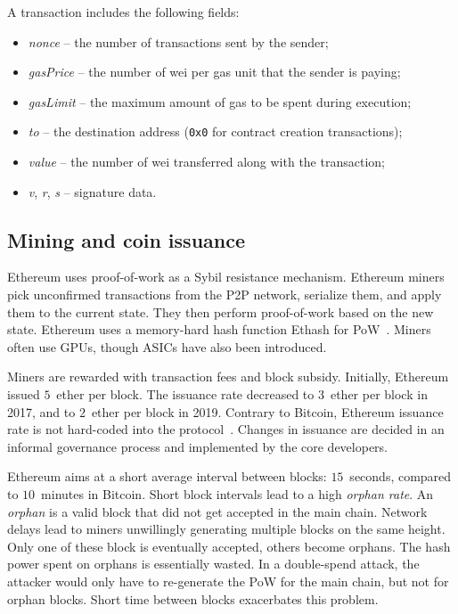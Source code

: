 A transaction includes the following fields:
\begin{itemize}
	\item \emph{nonce} -- the number of transactions sent by the sender;
	\item \emph{gasPrice} -- the number of wei per gas unit that the sender is paying;
	\item \emph{gasLimit} -- the maximum amount of gas to be spent during execution;
	\item \emph{to} -- the destination address (\texttt{0x0} for contract creation transactions);
	\item \emph{value} -- the number of wei transferred along with the transaction;
	\item \emph{v}, \emph{r}, \emph{s} -- signature data.
\end{itemize}



\subsection{Mining and coin issuance}

Ethereum uses proof-of-work as a Sybil resistance mechanism.
Ethereum miners pick unconfirmed transactions from the P2P network, serialize them, and apply them to the current state.
They then perform proof-of-work based on the new state.
Ethereum uses a memory-hard hash function Ethash for PoW~\cite{Ethash}.
Miners often use GPUs, though ASICs have also been introduced.

Miners are rewarded with transaction fees and block subsidy.
Initially, Ethereum issued $5$~ether per block.
The issuance rate decreased to $3$~ether per block in 2017, and to $2$~ether per block in 2019.
Contrary to Bitcoin, Ethereum issuance rate is not hard-coded into the protocol~\cite{Ethhub2020}.
Changes in issuance are decided in an informal governance process and implemented by the core developers.

Ethereum aims at a short average interval between blocks: $15$~seconds, compared to $10$~minutes in Bitcoin.
Short block intervals lead to a high \textit{orphan rate}.
An \textit{orphan} is a valid block that did not get accepted in the main chain.
Network delays lead to miners unwillingly generating multiple blocks on the same height.
Only one of these block is eventually accepted, others become orphans.
The hash power spent on orphans is essentially wasted.
In a double-spend attack, the attacker would only have to re-generate the PoW for the main chain, but not for orphan blocks.
Short time between blocks exacerbates this problem.

